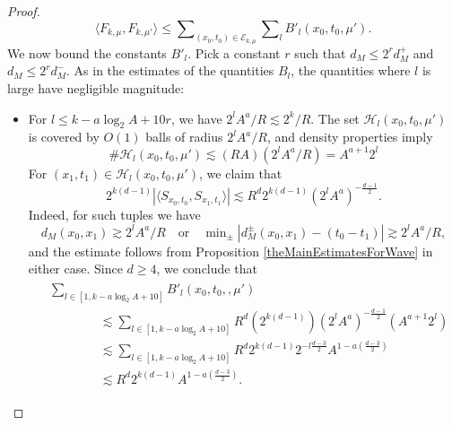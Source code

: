 \begin{proof}
\begin{equation}
    \langle F_{k,\mu}, F_{k,\mu'} \rangle \leq \sum\nolimits_{(x_0,t_0) \in \mathcal{E}_{k,\mu}} \sum\nolimits_l B'_l(x_0,t_0,\mu').
\end{equation}
%
We now bound the constants $B'_l$. Pick a constant $r$ such that $d_M \leq 2^r d_M^+$ and $d_M \leq 2^r d_M^-$. As in the estimates of the quantities $B_l$, the quantities where $l$ is large have negligible magnitude:
%
\begin{itemize}[leftmargin=8mm]
    \item For $l \leq k - a \log_2 A + 10 r$, we have $2^l A^a / R \lesssim 2^k / R$. The set $\mathcal{H}_l(x_0,t_0,\mu')$ is covered by $O(1)$ balls of radius $2^l A^a / R$, and density properties imply
    \begin{equation}
        \# \mathcal{H}_l(x_0,t_0,\mu') \lesssim (R A) (2^l A^a / R) = A^{a+1} 2^l
    \end{equation}
    For $(x_1,t_1) \in \mathcal{H}_l(x_0,t_0,\mu')$, we claim that
    \begin{equation}
        2^{k(d-1)} |\langle {S\!}_{x_0,t_0}, {S\!}_{x_1,t_1} \rangle| \lesssim R^{d} 2^{k(d-1)} (2^l A^a)^{- \frac{d-1}{2}}.
    \end{equation}
    Indeed, for such tuples we have
    \begin{equation}
        d_M(x_0,x_1) \gtrsim 2^l A^a / R \quad\text{or}\quad \min\nolimits_{\pm} |d_M^{\pm}(x_0,x_1) - (t_0 - t_1)| \gtrsim 2^l A^a / R,
    \end{equation}
    and the estimate follows from Proposition \ref{theMainEstimatesForWave} in either case. Since $d \geq 4$, we conclude that
    \begin{align} \label{BBBEquation}
    \begin{split}
        &\sum\nolimits_{l \in [1, k - a \log_2 A + 10]} B'_l(x_0,t_0,,\mu')\\
        &\quad\quad\quad\quad \lesssim \sum\nolimits_{l \in [1, k - a \log_2 A + 10]} R^{d} (2^{k(d-1)}) (2^l A^a)^{- \frac{d-1}{2}} (A^{a+1} 2^l)\\
        &\quad\quad\quad\quad \lesssim \sum\nolimits_{l \in [1, k - a \log_2 A + 10]} R^{d}  2^{k(d-1)} 2^{-l \frac{d-3}{2}} A^{1 - a \left( \frac{d-3}{2} \right)}\\
        &\quad\quad\quad\quad \lesssim R^{d} 2^{k(d-1)} A^{1 - a \left( \frac{d-3}{2} \right)}.
    \end{split}
    \end{align}


\end{itemize}
\end{proof}
